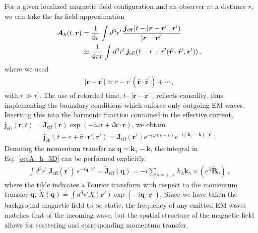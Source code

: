 \documentclass[a4paper,11pt]{article}
\begin{document}
For a given localized magnetic field configuration and an observer at a distance $r$, we can take the far-field approximation
%
\begin{equation}
    \begin{aligned}
    \label{eq:A_h_3D}
        {\bm A}_{h}(t,{\bm r} ) & = \frac{1}{4\pi} \int d^{3} { r}^{\prime} \, \frac{{\bm j}_{\rm eff} (  t  - \vert {\bm r} - {\bm r}^{\prime} \vert, {\bm r}^{\prime}) }{\vert {\bm r} - {\bm r}^{\prime} \vert}  \\ & \simeq \frac{1}{4\pi r} \int d^{3} { r}^{\prime} \, {\bm j}_{\rm eff} (  t  - r + r^{\prime} (\hat{\bm r} \cdot \hat{\bm r}^{\prime}, {\bm r}^{\prime}) ) \,,
    \end{aligned}
\end{equation}
%
where we used
%
\begin{align}
    \vert {\bm r} - {\bm r}^{\prime} \vert \simeq r - r^{\prime} (\hat{\bm r} \cdot \hat{\bm r}^{\prime})  + \cdots \,,
\end{align}
with $ r \gg r^{\prime} $.
%
The use of retarded time, $t - \vert {\bm r} - {\bm r}^{\prime} \vert$, reflects causality, thus implementing the boundary conditions which enforce only outgoing EM waves.
%
Inserting this into the harmonic function contained in the effective current, $\bm j_\text{eff}(\bm r, t) = \bm J_\text{eff}(\bm r) \exp(- i \omega t + i \bm k \cdot \bm r)$, we obtain
%
\begin{align}
\label{eq:j_eff_3D}
 \bm j_\text{eff}(t  - r + \hat{\bm r} \cdot \bm r', \bm r') = \bm J_\text{eff}(\bm r') 
 e^{-i \omega (t - r)} 
 e^{- i ( \bm{k}_{\gamma} - \bm{k} ) \cdot \bm{r}^{\prime}}
 \,.
\end{align}
%
Denoting the momentum transfer as $\bm q = \bm{k}_{\gamma} - \bm k$,
 the integral in Eq.~\eqref{eq:A_h_3D} can be performed explicitly,
%
 \begin{align}
    \int d^{3} r^{\prime} ~ \bm{J}_{\text{eff}} ({\bm r}^{\prime} ) \, e^{- i \bm q \cdot \bm r'}
     = \tilde{ \bm{J} }_{\text{eff}} (\bm q) =  - i  
     \sum_{\lambda = + , \times }  
     h_{\lambda} \bm{k}_{\gamma} \times ( e^{\lambda} \tilde{ \bm{B} }_{0} )
      \,,
     \label{eq:J_eff_localized}
 \end{align}
where the tilde indicates a Fourier transform with respect to the momentum transfer $\bm q$, $\tilde X(\bm q) = \int d^3r' X(\bm r') \exp(- i \bm{q} \cdot \bm{r}^{\prime})$.
Since we have taken the background magnetic field to be static, the frequency of any emitted EM waves matches that of the incoming wave, but the spatial structure of the magnetic field allows for scattering and corresponding momentum transfer.
\end{document}
